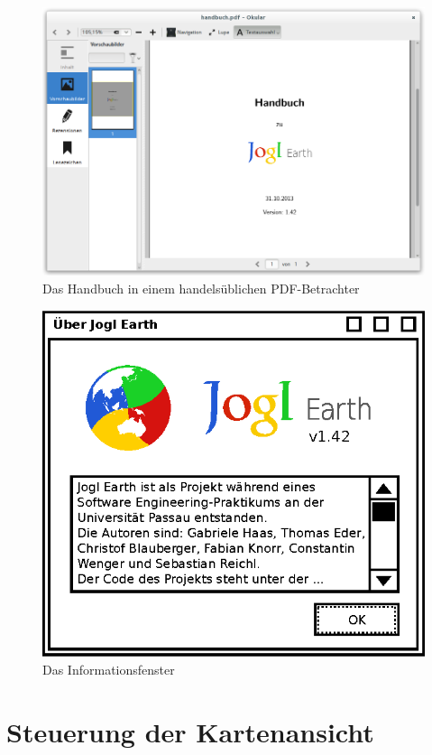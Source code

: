 \documentclass[10pt]{scrreprt}
\begin{document}
\begin{figure}
	\centering
	\includegraphics[scale=0.5]{GUI-Handbuch.png}
	\caption{Das Handbuch in einem handelsüblichen PDF-Betrachter}
\end{figure}
\begin{figure}
	\centering
	\includegraphics[scale=0.9]{GUI-About.eps}
	\caption{Das Informationsfenster}
\end{figure}

\clearpage
\pagebreak

\section{Steuerung der Kartenansicht}
\end{document}
